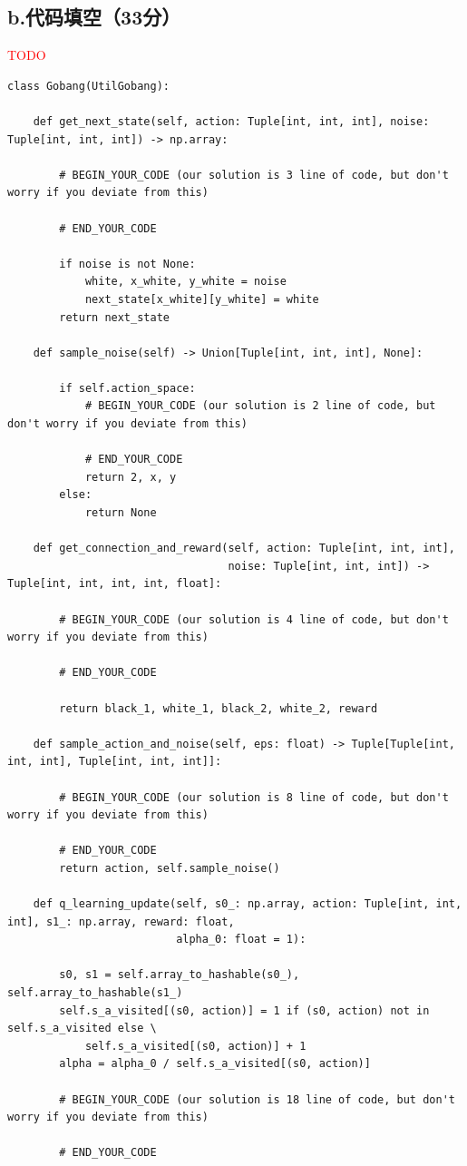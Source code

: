 \documentclass{article}
\begin{document}
\subsection*{b.代码填空（33分）}
\textcolor{red}{TODO} 
\begin{lstlisting}
class Gobang(UtilGobang):
    
    def get_next_state(self, action: Tuple[int, int, int], noise: Tuple[int, int, int]) -> np.array:

        # BEGIN_YOUR_CODE (our solution is 3 line of code, but don't worry if you deviate from this)
        
        # END_YOUR_CODE

        if noise is not None:
            white, x_white, y_white = noise
            next_state[x_white][y_white] = white
        return next_state

    def sample_noise(self) -> Union[Tuple[int, int, int], None]:

        if self.action_space:
            # BEGIN_YOUR_CODE (our solution is 2 line of code, but don't worry if you deviate from this)
            
            # END_YOUR_CODE
            return 2, x, y
        else:
            return None

    def get_connection_and_reward(self, action: Tuple[int, int, int],
                                  noise: Tuple[int, int, int]) -> Tuple[int, int, int, int, float]:

        # BEGIN_YOUR_CODE (our solution is 4 line of code, but don't worry if you deviate from this)
        
        # END_YOUR_CODE

        return black_1, white_1, black_2, white_2, reward

    def sample_action_and_noise(self, eps: float) -> Tuple[Tuple[int, int, int], Tuple[int, int, int]]:

        # BEGIN_YOUR_CODE (our solution is 8 line of code, but don't worry if you deviate from this)

        # END_YOUR_CODE
        return action, self.sample_noise()

    def q_learning_update(self, s0_: np.array, action: Tuple[int, int, int], s1_: np.array, reward: float,
                          alpha_0: float = 1):

        s0, s1 = self.array_to_hashable(s0_), self.array_to_hashable(s1_)
        self.s_a_visited[(s0, action)] = 1 if (s0, action) not in self.s_a_visited else \
            self.s_a_visited[(s0, action)] + 1
        alpha = alpha_0 / self.s_a_visited[(s0, action)]

        # BEGIN_YOUR_CODE (our solution is 18 line of code, but don't worry if you deviate from this)
        
        # END_YOUR_CODE


\end{lstlisting}
\end{document}
